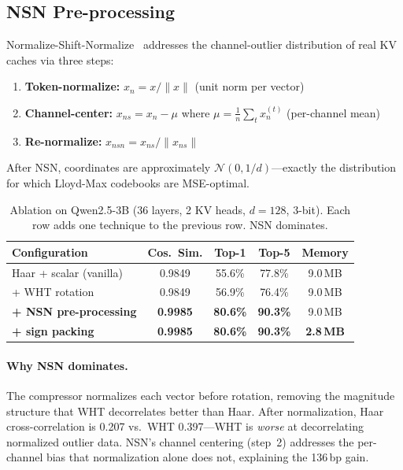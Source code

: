\documentclass[sigconf,anonymous,review]{acmart}
\newcommand{\norm}[1]{\lVert #1 \rVert}
\begin{document}
\subsection{NSN Pre-processing}

Normalize-Shift-Normalize~\cite{nsnquant2025} addresses the channel-outlier
distribution of real KV caches via three steps:
\begin{enumerate}[nosep,leftmargin=*]
  \item \textbf{Token-normalize:} $x_n = x / \norm{x}$ (unit norm per vector)
  \item \textbf{Channel-center:} $x_{ns} = x_n - \mu$ where
        $\mu = \frac{1}{n}\sum_t x_n^{(t)}$ (per-channel mean)
  \item \textbf{Re-normalize:} $x_{nsn} = x_{ns} / \norm{x_{ns}}$
\end{enumerate}
After NSN, coordinates are approximately
$\mathcal{N}(0, 1/d)$---exactly the distribution for which Lloyd-Max
codebooks are MSE-optimal.

\begin{table}[t]
\centering
\caption{Ablation on Qwen2.5-3B (36 layers, 2 KV heads, $d=128$, 3-bit).
Each row adds one technique to the previous row. NSN dominates.}
\label{tab:ablation}
\begin{tabular}{lcccc}
\toprule
Configuration & Cos.\ Sim. & Top-1 & Top-5 & Memory \\
\midrule
Haar + scalar (vanilla)      & 0.9849 & 55.6\% & 77.8\% & 9.0\,MB \\
+ WHT rotation               & 0.9849 & 56.9\% & 76.4\% & 9.0\,MB \\
\textbf{+ NSN pre-processing} & \textbf{0.9985} & \textbf{80.6\%} & \textbf{90.3\%} & 9.0\,MB \\
\textbf{+ sign packing}      & \textbf{0.9985} & \textbf{80.6\%} & \textbf{90.3\%} & \textbf{2.8\,MB} \\
\bottomrule
\end{tabular}
\end{table}

\paragraph{Why NSN dominates.}
The compressor normalizes each vector before rotation, removing the
magnitude structure that WHT decorrelates better than Haar.
After normalization, Haar cross-correlation is 0.207 vs.\ WHT 0.397---WHT
is \emph{worse} at decorrelating normalized outlier data.
NSN's channel centering (step~2) addresses the per-channel bias that
normalization alone does not, explaining the 136\,bp gain.
\end{document}
